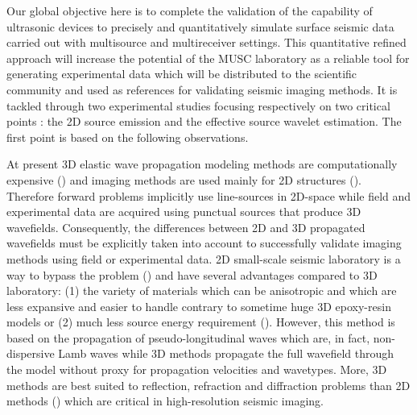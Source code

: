 \documentclass[extra,mreferee]{gji}
\begin{document}
Our global objective here is to complete the validation of the capability of ultrasonic devices to precisely and quantitatively simulate surface seismic data carried out with multisource and multireceiver settings. This quantitative refined approach will increase the potential of the MUSC laboratory as a reliable tool for generating experimental data which will be distributed to the scientific community and used as references for validating seismic imaging methods. It is tackled through two experimental studies focusing respectively on two critical points : the 2D source emission and the effective source wavelet estimation. The first point is based on the following observations. 

At present 3D elastic wave propagation modeling methods are computationally expensive (\cite{etienne2010computational,borisov2013efficient,brossier2013performances,butzer20133d,borisov2015three}) and imaging methods are used mainly for 2D structures (\cite{brossier2009two,romdhane2011shallow,bretaudeau2013fwi,groos2014role}). Therefore forward problems implicitly use line-sources in 2D-space while field and experimental data are acquired using punctual sources that produce 3D wavefields. Consequently, the differences between 2D and 3D propagated wavefields must be explicitly taken into account to successfully validate imaging methods using field or experimental data. 2D small-scale seismic laboratory is a way to bypass the problem (\cite{oliver1954two,angona1960two,mo2015development}) and have several advantages compared to 3D laboratory: (1) the variety of materials which can be anisotropic and which are less expansive and easier to handle contrary to sometime huge 3D epoxy-resin models or (2) much less source energy requirement (\cite{oliver1954two,mo2015development}). However, this method is based on the propagation of pseudo-longitudinal waves which are, in fact, non-dispersive Lamb waves while 3D methods propagate the full wavefield through the model without proxy for propagation velocities and wavetypes. More, 3D methods are best suited to reflection, refraction and diffraction problems than 2D methods (\cite{angona1960two}) which are critical in high-resolution seismic imaging.
\end{document}
